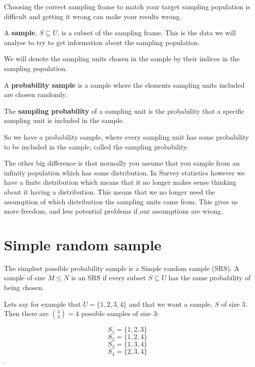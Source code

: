 \documentclass{article}
\begin{document}
Choosing the correct sampling frame to match your target sampling population is
difficult and getting it wrong can make your results wrong.


\begin{definition} \label{def:sample}
A \textbf{sample}, $S \subseteq U$, is a subset of the sampling frame. This is the data we will analyse to try to get information about the sampling population.
\end{definition}

We will denote the sampling units chosen in the sample by their indices in the
sampling population.

\begin{definition} \label{def:probSample}
A \textbf{probability sample} is a sample where the elements sampling units included are chosen randomly.
\end{definition}

\begin{definition} \label{def:sampProb}
The \textbf{sampling probability} of a sampling unit is the probability that a specific sampling unit is included in the sample.
\end{definition}

So we have a probability sample, where every sampling unit has some probability to be included in the sample, called the sampling probability.


The other big difference is that normally you assume that you sample from an
infinity population which has some distribution. In Survey statistics however we
have a finite distribution which means that it no longer makes sense thinking
about it having a distribution. This means that we no longer need the assumption
of which distribution the sampling units come from. This gives us more freedom,
and less potential problems if our assumptions are wrong.

\section{Simple random sample}

The simplest possible probability sample is a Simple random sample (SRS). A
sample of size $M \leq N$ is an SRS if every subset $S \subseteq U$ has the same
probability of being chosen.

Lets say for example that $U = \{1, 2, 3, 4\}$ and that we want a sample, $S$ of
size $3$. Then there are $\binom{4}{3} = 4$  possible samples of size $3$:

$$ S_1 = \{1, 2, 3\} $$
$$ S_2 = \{1, 2, 4\} $$
$$ S_3 = \{1, 3, 4\} $$
$$ S_4 = \{2, 3, 4\} $$.
\end{document}
